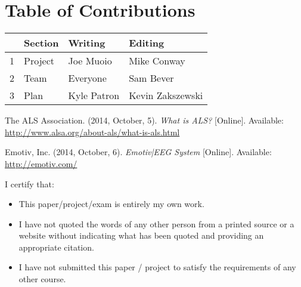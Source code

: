 \documentclass{report}
\begin{document}
\section*{\centering Table of Contributions}
\begin{tabular}{| l | l | l | l |}
    \hline
     & Section & Writing & Editing \\
    \hline \hline
    1 & Project & Joe Muoio  & Mike Conway \\ \hline
    2 & Team & Everyone & Sam Bever \\ \hline
    3 & Plan & Kyle Patron & Kevin Zakszewski \\ \hline
\end{tabular}
\begin{thebibliography}{1}

     The ALS Association. (2014, October, 5). \textit{What
        is ALS?} [Online]. Available:
        \url{http://www.alsa.org/about-als/what-is-als.html}
 
     Emotiv, Inc. (2014, October, 6). \textit{Emotiv|EEG
        System} [Online]. Available: \url{http://emotiv.com/}

\end{thebibliography}
\newpage
\noindent I certify that:
\begin{itemize}
\item This paper/project/exam is entirely my own work.
\item I have not quoted the words of any other person from a printed source or a website without indicating what has been quoted and providing an appropriate citation.
\item I have not submitted this paper / project to satisfy the requirements of any other course.
\end{itemize}

\vspace{1cm}
\noindent{}


\vspace{0.5cm}
\noindent{}

\vspace{0.5cm}
\noindent{}
\end{document}
